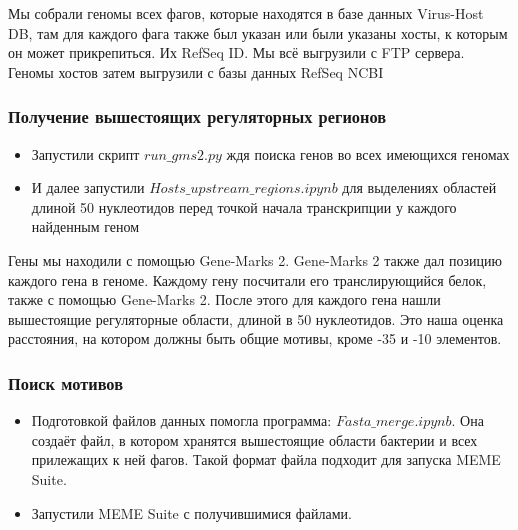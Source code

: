 \documentclass[14pt]{extarticle}
\begin{document}
    \par{Мы собрали геномы всех фагов, которые находятся в базе данных Virus-Host DB, там для каждого фага также был 
    указан или были указаны хосты, к которым он может прикрепиться. Их RefSeq ID. Мы всё выгрузили с FTP сервера. Геномы
    хостов затем выгрузили с базы данных RefSeq NCBI}

    \begin{center}
    \item \subsubsection{Получение вышестоящих регуляторных регионов}
    \end{center}
        \begin{itemize}
            \item Запустили скрипт \(run\_gms2.py\) ждя поиска генов во всех имеющихся геномах
            \item И далее запустили \(Hosts\_upstream\_regions.ipynb\) для выделениях областей длиной 50 нуклеотидов 
            перед точкой начала транскрипции у каждого найденным геном
        \end{itemize}
    \par{Гены мы находили с помощью Gene-Marks 2. Gene-Marks 2 также дал позицию каждого гена в геноме. Каждому гену 
    посчитали его транслирующийся белок, также с помощью Gene-Marks 2. После этого для каждого гена нашли вышестоящие 
    регуляторные области, длиной в 50 нуклеотидов. Это наша оценка расстояния, на котором должны быть общие мотивы, 
    кроме -35 и -10 элементов.}
    \begin{center}
    \item \subsubsection{Поиск мотивов}
    \end{center}
        \begin{itemize}
            \item Подготовкой файлов данных помогла программа: \(Fasta\_merge.ipynb\). Она создаёт файл, в котором 
            хранятся вышестоящие области бактерии и всех прилежащих к ней фагов. Такой формат файла подходит для запуска
            MEME Suite.
            \item Запустили MEME Suite с получившимися файлами.
        \end{itemize}
\end{document}
